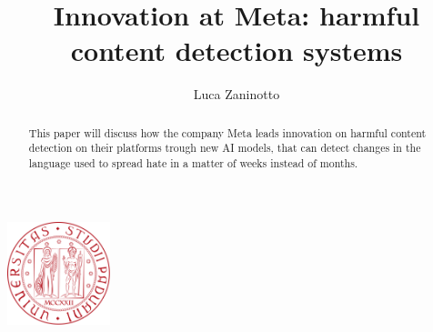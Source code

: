 \documentclass[12pt, a4paper]{article}
\title{Innovation at Meta: harmful content detection systems}
\author{ Luca Zaninotto }
\begin{document}
\maketitle
\begin{center}
  \includegraphics[width=3cm]{images/logo}
\end{center}
\begin{abstract}
  This paper will discuss how the company Meta leads innovation on
  harmful content detection on their platforms trough new AI models,
  that can detect changes in the language used to spread hate in a
  matter of weeks instead of months.
\end{abstract}






\newpage
\printbibliography[title={Bibliography}]
\end{document}
